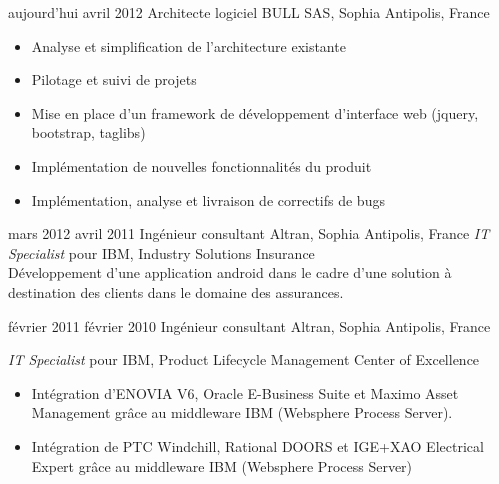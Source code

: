 \documentclass[]{roger-cv}
\begin{document}
\begin{entrylist}
  \entry
    {aujourd'hui}
    {avril 2012}
    {Architecte logiciel}
    {BULL SAS, Sophia Antipolis, France}  
    {
      \vspace{-3mm}
      \begin{itemize}
        \item{Analyse et simplification de l'architecture existante}
        \item Pilotage et suivi de projets
        \item{Mise en place d'un framework de développement d'interface web (jquery, bootstrap, taglibs)}
        \item{Implémentation de nouvelles fonctionnalités du produit}
        \item{Implémentation, analyse et livraison de correctifs de bugs}
       \end{itemize}
    }

  \entry
    {mars 2012}
    {avril 2011}
    {Ingénieur consultant}
    {Altran, Sophia Antipolis, France}  
    {
      \emph{IT Specialist} pour IBM, Industry Solutions Insurance\\ 
      Développement d'une application android dans le cadre d'une solution à destination 
      des clients dans le domaine des assurances.
    }

  \entry
    {février 2011}
    {février 2010}
    {Ingénieur consultant}
    {Altran, Sophia Antipolis, France}  
    {
      \emph{IT Specialist} pour IBM, Product Lifecycle Management Center of Excellence\\
      \vspace{-3mm}
        \begin{itemize}
           \item Intégration d'ENOVIA V6, Oracle E-Business Suite et Maximo Asset Management grâce au middleware IBM (Websphere Process Server).
 	\item Intégration de PTC Windchill, Rational DOORS et IGE+XAO Electrical Expert grâce au middleware IBM (Websphere Process Server)
         \end{itemize}
    }


\end{entrylist}
\end{document}
